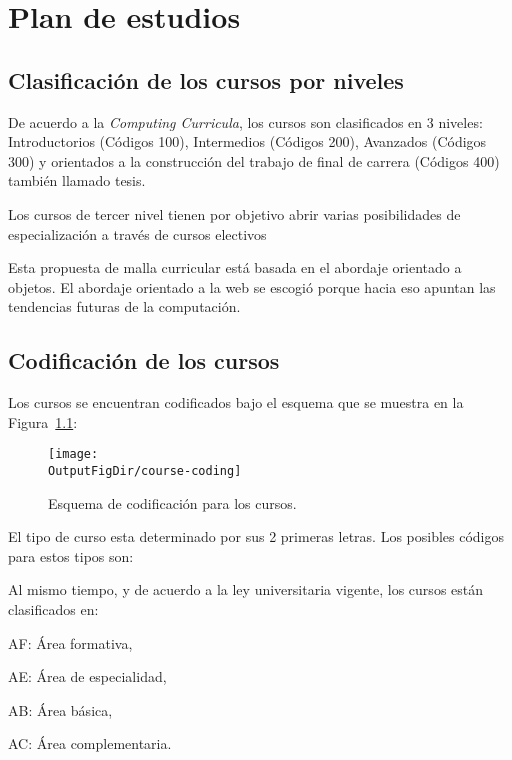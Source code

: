 \chapter{Plan de estudios \YYYY}\label{chap:GeneralInfo} 

\section{Clasificación de los cursos por niveles}
De acuerdo a la \textit{Computing Curricula}, los cursos son clasificados en 3 niveles: Introductorios (Códigos 100), 
Intermedios  (Códigos 200), Avanzados  (Códigos 300) y orientados a la construcción del trabajo de final de carrera  (Códigos 400) también llamado tesis.

Los cursos de tercer nivel tienen por objetivo abrir varias posibilidades de especialización a través de cursos electivos

Esta propuesta de malla curricular está basada en el abordaje orientado a objetos. 
El abordaje orientado a la web se escogió porque hacia eso apuntan las tendencias 
futuras de la computación.

\section{Codificación de los cursos}
Los cursos se encuentran codificados bajo el esquema que se muestra en la Figura~\ref{fig:course-number}:

\begin{figure}[ht]
   \centering
   \texttt{[image: \\OutputFigDir/course-coding]}
   \caption{Esquema de codificación para los cursos.}
   \label{fig:course-number}
\end{figure}

El tipo de curso esta determinado por sus 2 primeras letras. Los posibles códigos para estos tipos son:


Al mismo tiempo, y de acuerdo a la ley universitaria vigente, los cursos están clasificados en:
\begin{inparadesc}
\item [AF:] Área formativa,
\item [AE:] Área de especialidad,
\item [AB:] Área básica,
\item [AC:] Área complementaria.
\end{inparadesc}



